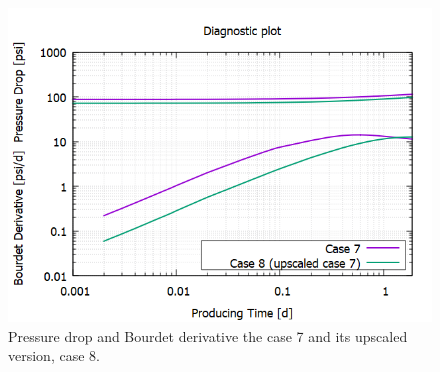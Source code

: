 \begin{figure}[H]
	\centering
	\includegraphics[width=0.8\linewidth]{Images/55}
	\caption{Pressure drop and Bourdet derivative the case 7 and its upscaled version, case 8.}
	\label{fig:55}
\end{figure}

